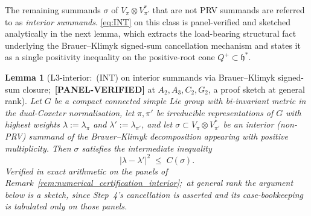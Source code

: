 \documentclass[11pt,a4paper]{article}
\theoremstyle{plain}
\newtheorem{lemma}[theorem]{Lemma}
\theoremstyle{definition}
\newcommand{\Cas}{C}
\begin{document}
The remaining summands $\sigma$ of $V_\pi \otimes V_{\pi'}^*$ that are
not PRV summands are referred to as \emph{interior summands}.
\eqref{eq:INT} on this class is panel-verified and sketched analytically in
the next lemma, which extracts the load-bearing structural fact
underlying the Brauer--Klimyk signed-sum cancellation mechanism and
states it as a single positivity inequality on the positive-root cone
$Q^+ \subset \mathfrak{h}^*$.

\begin{lemma}[L3-interior:\ (INT) on interior summands via Brauer--Klimyk
signed-sum closure;\ \textbf{[PANEL-VERIFIED]} at $A_2, A_3, C_2, G_2$, a
proof sketch at general rank]\label{lem:L3_interior}
Let $G$ be a compact connected simple Lie group with bi-invariant
metric in the dual-Coxeter normalisation, let $\pi, \pi'$ be irreducible
representations of $G$ with highest weights $\lambda := \lambda_\pi$
and $\lambda' := \lambda_{\pi'}$, and let
$\sigma \subset V_\pi \otimes V_{\pi'}^*$ be an interior (non-PRV)
summand of the Brauer--Klimyk decomposition appearing with positive
multiplicity. Then $\sigma$ satisfies the intermediate
inequality
\begin{equation}\label{eq:INT_interior}
   |\lambda - \lambda'|^2 \;\le\; \Cas(\sigma).
\end{equation}
Verified in exact arithmetic on the panels of
Remark~\ref{rem:numerical_certification_interior};\ at general rank the
argument below is a sketch, since Step~4's cancellation is asserted and its
case-bookkeeping is tabulated only on those panels.
\end{lemma}
\end{document}
